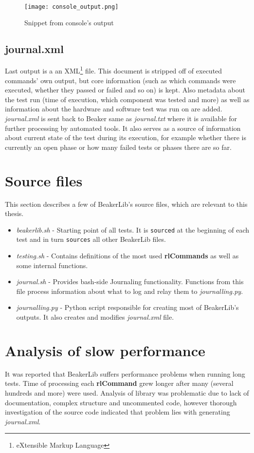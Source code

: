 \begin{figure}
  \texttt{[image: console\_output.png]}
  \caption{Snippet from console's output}
  \label{fig:console_output}
\end{figure}

\subsection{journal.xml}
Last output is a an XML\footnote{eXtensible Markup Language} file. This document is stripped off of executed commands' own output, but core information (such as which commands were executed, whether they passed or failed and so on) is kept. Also metadata about the test run (time of execution, which component was tested and more) as well as information about the hardware and software test was run on are added. \textit{journal.xml} is sent back to Beaker same as \textit{journal.txt} where it is available for further processing by automated tools. It also serves as a source of information about current state of the test during its execution, for example whether there is currently an open phase or how many failed tests or phases there are so far.

\section{Source files}
This section describes a few of BeakerLib's source files, which are relevant to this thesis.
\begin{itemize}
\item \textit{beakerlib.sh} - Starting point of all tests. It is \texttt{sourced} at the beginning of each test and in turn \texttt{sources} all other BeakerLib files.
\item \textit{testing.sh} - Contains definitions of the most used \textbf{rlCommands} as well as some internal functions.
\item \textit{journal.sh} - Provides bash-side Journaling functionality. Functions from this file process information about what to log and relay them to \textit{journalling.py}.
\item \textit{journalling.py} - Python script responsible for creating most of BeakerLib's outputs. It also creates and modifies \textit{journal.xml} file.
\end{itemize}

\section{Analysis of slow performance}
It was reported that BeakerLib suffers performance problems when running long tests. Time of processing each \textbf{rlCommand} grew longer after many (several hundreds and more) were used. Analysis of library was problematic due to lack of documentation, complex structure and uncommented code, however thorough investigation of the source code indicated that problem lies with generating \textit{journal.xml}. 

